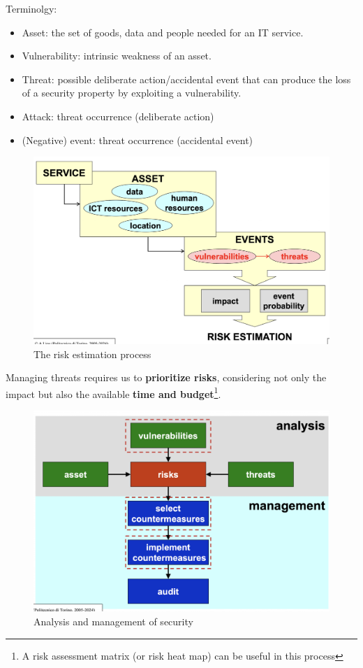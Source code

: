 \begin{multicols}{2}
    Terminolgy:
    \begin{itemize}
        \item Asset: the set of goods, data and people needed for an IT service.
        \item Vulnerability: intrinsic weakness of an asset.
        \item Threat: possible deliberate action/accidental event that can produce the loss of a security property by exploiting a vulnerability.
        \item Attack: threat occurrence (deliberate action)
        \item (Negative) event: threat occurrence (accidental event)
    \end{itemize}
    \columnbreak
    
    \begin{figure}[H]
        \centering
        \includegraphics[width=\linewidth]{Images/Introduction/riskEvaluation.png}
        \caption{The risk estimation process}
    \end{figure}
\end{multicols}

Managing threats requires us to \textbf{prioritize risks}, considering not only the impact but also the available \textbf{time and budget}\footnote{A risk assessment matrix (or risk heat map) can be useful in this process}.

\begin{figure}[H]
    \centering
    \includegraphics[width=0.5\linewidth]{Images/Introduction/analysisAndManagement.png}
    \caption{Analysis and management of security}
\end{figure}

